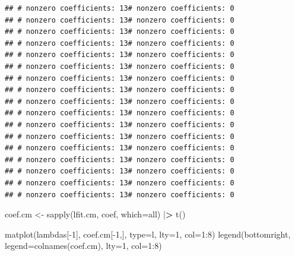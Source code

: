 \documentclass[
]{article}
\newenvironment{Shaded}{\begin{snugshade}}{\end{snugshade}}
\newcommand{\AttributeTok}[1]{\textcolor[rgb]{0.77,0.63,0.00}{#1}}
\newcommand{\DecValTok}[1]{\textcolor[rgb]{0.00,0.00,0.81}{#1}}
\newcommand{\ErrorTok}[1]{\textcolor[rgb]{0.64,0.00,0.00}{\textbf{#1}}}
\newcommand{\FunctionTok}[1]{\textcolor[rgb]{0.00,0.00,0.00}{#1}}
\newcommand{\NormalTok}[1]{#1}
\newcommand{\OtherTok}[1]{\textcolor[rgb]{0.56,0.35,0.01}{#1}}
\newcommand{\SpecialCharTok}[1]{\textcolor[rgb]{0.00,0.00,0.00}{#1}}
\newcommand{\StringTok}[1]{\textcolor[rgb]{0.31,0.60,0.02}{#1}}
\begin{document}
\begin{verbatim}
## # nonzero coefficients: 13# nonzero coefficients: 0          
## # nonzero coefficients: 13# nonzero coefficients: 0          
## # nonzero coefficients: 13# nonzero coefficients: 0          
## # nonzero coefficients: 13# nonzero coefficients: 0          
## # nonzero coefficients: 13# nonzero coefficients: 0          
## # nonzero coefficients: 13# nonzero coefficients: 0          
## # nonzero coefficients: 13# nonzero coefficients: 0          
## # nonzero coefficients: 13# nonzero coefficients: 0          
## # nonzero coefficients: 13# nonzero coefficients: 0          
## # nonzero coefficients: 13# nonzero coefficients: 0          
## # nonzero coefficients: 13# nonzero coefficients: 0          
## # nonzero coefficients: 13# nonzero coefficients: 0          
## # nonzero coefficients: 13# nonzero coefficients: 0          
## # nonzero coefficients: 13# nonzero coefficients: 0          
## # nonzero coefficients: 13# nonzero coefficients: 0          
## # nonzero coefficients: 13# nonzero coefficients: 0          
## # nonzero coefficients: 13# nonzero coefficients: 0          
\end{verbatim}

\begin{Shaded}
\begin{Highlighting}[]
\NormalTok{coef.cm }\OtherTok{\textless{}{-}} \FunctionTok{sapply}\NormalTok{(lfit.cm, coef, }\AttributeTok{which=}\StringTok{\textquotesingle{}all\textquotesingle{}}\NormalTok{) }\SpecialCharTok{|}\ErrorTok{\textgreater{}} 
  \FunctionTok{t}\NormalTok{() }

\FunctionTok{matplot}\NormalTok{(lambdas[}\SpecialCharTok{{-}}\DecValTok{1}\NormalTok{], coef.cm[}\SpecialCharTok{{-}}\DecValTok{1}\NormalTok{,], }\AttributeTok{type=}\StringTok{\textquotesingle{}l\textquotesingle{}}\NormalTok{, }\AttributeTok{lty=}\DecValTok{1}\NormalTok{, }\AttributeTok{col=}\DecValTok{1}\SpecialCharTok{:}\DecValTok{8}\NormalTok{)}
\FunctionTok{legend}\NormalTok{(}\StringTok{\textquotesingle{}bottomright\textquotesingle{}}\NormalTok{, }\AttributeTok{legend=}\FunctionTok{colnames}\NormalTok{(coef.cm), }\AttributeTok{lty=}\DecValTok{1}\NormalTok{, }\AttributeTok{col=}\DecValTok{1}\SpecialCharTok{:}\DecValTok{8}\NormalTok{)}
\end{Highlighting}
\end{Shaded}
\end{document}
